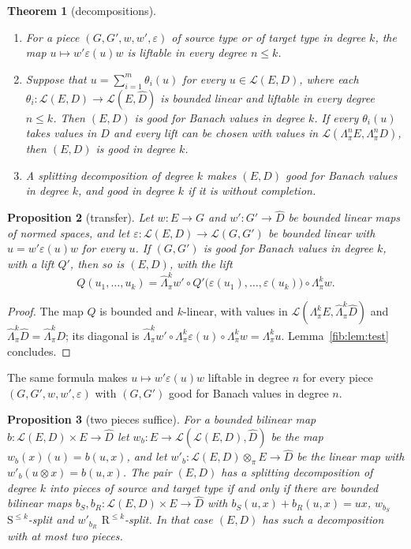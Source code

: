 \documentclass[11pt]{amsart}
\newtheorem{theorem}{Theorem}[section]
\newtheorem{proposition}[theorem]{Proposition}
\theoremstyle{definition}
\theoremstyle{remark}
\numberwithin{equation}{section}
\newcommand{\cL}{\mathcal L}
\theoremstyle{plain}
\theoremstyle{definition}
\theoremstyle{plain}
\begin{document}
\begin{theorem}[decompositions]\label{cmb:thm:decomposition}
\begin{enumerate}
\item For a piece $(G,G',w,w',\varepsilon)$ of source type or of target type in degree $k$, the map
$u\mapsto w'\varepsilon(u)w$ is liftable in every degree $n\le k$.
\item Suppose that $u=\sum_{i=1}^m\theta_i(u)$ for every $u\in\cL(E,D)$, where each
$\theta_i\colon\cL(E,D)\to\cL(E,\widehat D)$ is bounded linear and liftable in every degree $n\le k$. Then $(E,D)$ is good
for Banach values in degree $k$. If every $\theta_i(u)$ takes values in $D$ and every lift can be chosen with values in
$\cL(\Lambda^n_\pi E,\Lambda^n_\pi D)$, then $(E,D)$ is good in degree $k$.
\item A splitting decomposition of degree $k$ makes $(E,D)$ good for Banach values in degree $k$, and good in degree $k$
if it is without completion.
\end{enumerate}
\end{theorem}

\begin{proposition}[transfer]\label{cmb:prop:transfer}
Let $w\colon E\to G$ and $w'\colon G'\to\widehat D$ be bounded linear maps of normed spaces, and let
$\varepsilon\colon\cL(E,D)\to\cL(G,G')$ be bounded linear with $u=w'\varepsilon(u)w$ for every $u$. If $(G,G')$ is good for
Banach values in degree $k$, with a lift $Q'$, then so is $(E,D)$, with the lift
\[
 Q(u_1,\dots,u_k)=\widehat\Lambda^k_\pi w'\circ Q'\bigl(\varepsilon(u_1),\dots,\varepsilon(u_k)\bigr)\circ\Lambda^k_\pi w .
\]
\end{proposition}

\begin{proof}
The map $Q$ is bounded and $k$-linear, with values in $\cL(\Lambda^k_\pi E,\widehat\Lambda^k_\pi\widehat D)$ and
$\widehat\Lambda^k_\pi\widehat D=\widehat\Lambda^k_\pi D$; its diagonal is
$\widehat\Lambda^k_\pi w'\circ\Lambda^k_\pi\varepsilon(u)\circ\Lambda^k_\pi w=\Lambda^k_\pi u$. Lemma~\ref{fib:lem:test}
concludes.
\end{proof}

The same formula makes $u\mapsto w'\varepsilon(u)w$ liftable in degree $n$ for every piece $(G,G',w,w',\varepsilon)$ with
$(G,G')$ good for Banach values in degree $n$.

\begin{proposition}[two pieces suffice]\label{cmb:prop:normal-form}
For a bounded bilinear map $b\colon\cL(E,D)\times E\to\widehat D$ let $w_b\colon E\to\cL(\cL(E,D),\widehat D)$ be the
map $w_b(x)(u)=b(u,x)$, and let $w'_b\colon\cL(E,D)\otimes_\pi E\to\widehat D$ be the linear map with
$w'_b(u\otimes x)=b(u,x)$. The pair $(E,D)$ has a splitting decomposition of degree $k$ into pieces of source and target
type if and only if there are bounded bilinear maps $b_S,b_R\colon\cL(E,D)\times E\to\widehat D$ with
$b_S(u,x)+b_R(u,x)=ux$, $w_{b_S}$ $\mathrm S^{\le k}$-split and $w'_{b_R}$ $\mathrm R^{\le k}$-split. In that case $(E,D)$
has such a decomposition with at most two pieces.
\end{proposition}
\end{document}
